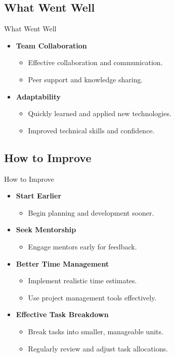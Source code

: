 \documentclass{beamer}
\begin{document}
\subsection{What Went Well}
\begin{frame}{What Went Well}
    \begin{itemize}
        \item \textbf{Team Collaboration}
        \begin{itemize}
            \item Effective collaboration and communication.
            \item Peer support and knowledge sharing.
        \end{itemize}
        \item \textbf{Adaptability}
        \begin{itemize}
            \item Quickly learned and applied new technologies.
            \item Improved technical skills and confidence.
        \end{itemize}
    \end{itemize}
\end{frame}

\subsection{How to Improve}
\begin{frame}{How to Improve}
    \begin{itemize}
        \item \textbf{Start Earlier}
        \begin{itemize}
            \item Begin planning and development sooner.
        \end{itemize}
        \item \textbf{Seek Mentorship}
        \begin{itemize}
            \item Engage mentors early for feedback.
        \end{itemize}
        \item \textbf{Better Time Management}
        \begin{itemize}
            \item Implement realistic time estimates.
            \item Use project management tools effectively.
        \end{itemize}
        \item \textbf{Effective Task Breakdown}
        \begin{itemize}
            \item Break tasks into smaller, manageable units.
            \item Regularly review and adjust task allocations.
        \end{itemize}
    \end{itemize}
\end{frame}
\end{document}
